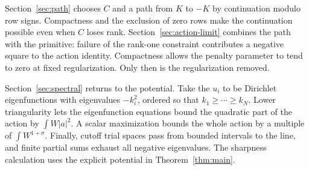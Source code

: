 Section~\ref{sec:path} chooses $C$ and a path from $K$ to $-K$ by
continuation modulo row signs. Compactness and the exclusion of zero rows
make the continuation possible even when $C$ loses rank.
Section~\ref{sec:action-limit} combines the path with the primitive:
failure of the rank-one constraint contributes a negative square to the
action identity. Compactness allows the penalty parameter to tend to zero
at fixed regularization. Only then is the regularization removed.

Section~\ref{sec:spectral} returns to the potential. Take the $u_i$ to be Dirichlet eigenfunctions with
eigenvalues $-k_i^2$, ordered so that $k_1\ge\cdots\ge k_N$.
Lower triangularity lets the eigenfunction equations bound the quadratic
part of the action by $\int W|a|^2$. A scalar maximization bounds the whole
action by a multiple of $\int W^{1+\sigma}$. Finally, cutoff trial spaces
pass from bounded intervals to the line, and finite partial sums exhaust
all negative eigenvalues. The sharpness calculation uses the explicit
potential in Theorem~\ref{thm:main}.
